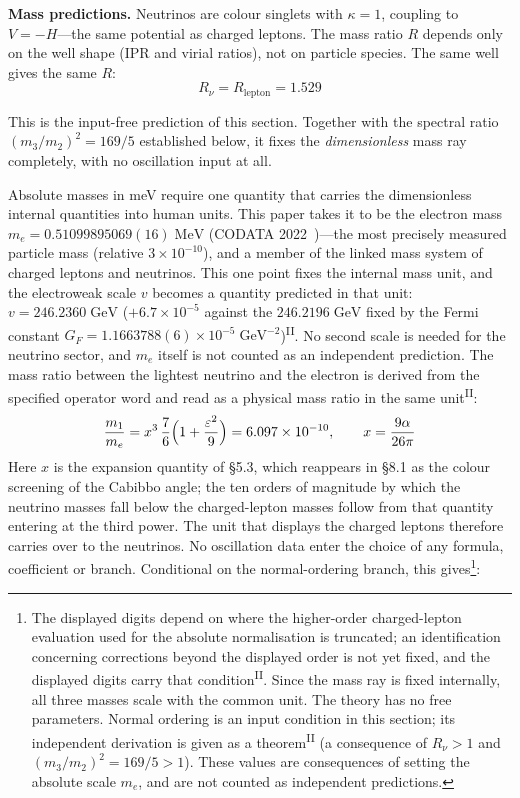 \documentclass[12pt,a4paper]{article}
\newcommand{\PII}{\textsuperscript{\textup{II}}}
\begin{document}
\noindent\textbf{Mass predictions.}\;
Neutrinos are colour singlets with $\kappa = 1$, coupling to $V = -H$---the same potential as charged leptons. The mass ratio $R$ depends only on the well shape (IPR and virial ratios), not on particle species. The same well gives the same $R$:
\[R_\nu = R_\mathrm{lepton} = 1.529\]
\begin{sloppypar}
This is the input-free prediction of this section. Together with the spectral ratio $(m_3/m_2)^2 = 169/5$ established below, it fixes the \emph{dimensionless} mass ray completely, with no oscillation input at all.

Absolute masses in meV require one quantity that carries the dimensionless internal quantities into human units. This paper takes it to be the electron mass $m_e = 0.51099895069(16)\;\mathrm{MeV}$ (CODATA 2022~\cite{codata})---the most precisely measured particle mass (relative $3\times10^{-10}$), and a member of the linked mass system of charged leptons and neutrinos. This one point fixes the internal mass unit, and the electroweak scale $v$ becomes a quantity predicted in that unit: $v = 246.2360\;\mathrm{GeV}$ ($+6.7\times10^{-5}$ against the $246.2196\;\mathrm{GeV}$ fixed by the Fermi constant $G_F = 1.1663788(6)\times10^{-5}\;\mathrm{GeV}^{-2}$)\PII{}. No second scale is needed for the neutrino sector, and $m_e$ itself is not counted as an independent prediction. The mass ratio between the lightest neutrino and the electron is derived from the specified operator word and read as a physical mass ratio in the same unit\PII{}:
\[\frac{m_1}{m_e} = x^3\,\frac{7}{6}\Bigl(1 + \frac{\varepsilon^2}{9}\Bigr) = 6.097 \times 10^{-10},\qquad x = \frac{9\alpha}{26\pi}\]
Here $x$ is the expansion quantity of \S5.3, which reappears in \S8.1 as the colour screening of the Cabibbo angle; the ten orders of magnitude by which the neutrino masses fall below the charged-lepton masses follow from that quantity entering at the third power. The unit that displays the charged leptons therefore carries over to the neutrinos. No oscillation data enter the choice of any formula, coefficient or branch. Conditional on the normal-ordering branch, this gives\footnote{The displayed digits depend on where the higher-order charged-lepton evaluation used for the absolute normalisation is truncated; an identification concerning corrections beyond the displayed order is not yet fixed, and the displayed digits carry that condition\PII{}. Since the mass ray is fixed internally, all three masses scale with the common unit. The theory has no free parameters. Normal ordering is an input condition in this section; its independent derivation is given as a theorem\PII{} (a consequence of $R_\nu > 1$ and $(m_3/m_2)^2 = 169/5 > 1$). These values are consequences of setting the absolute scale $m_e$, and are not counted as independent predictions.}:
\end{sloppypar}
\end{document}
